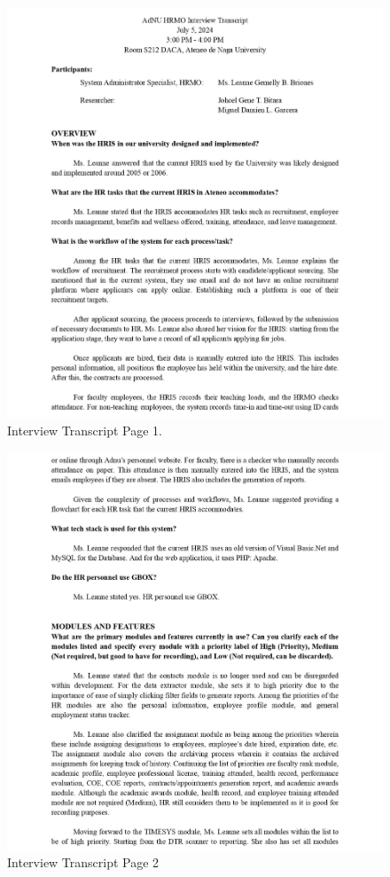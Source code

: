\begin{figure}[H]
    \centering
    \includegraphics[width=1\linewidth]{figures/misc/minutes/interview-transcript-0001.jpg}
    \caption{Interview Transcript Page 1.}
    \label{fig:interview-transcript-0001}
\end{figure}

\begin{figure}[H]
    \centering
    \includegraphics[width=1\linewidth]{figures/misc/minutes/interview-transcript-0002.jpg}
    \caption{Interview Transcript Page 2}
    \label{fig:interview-transcript-0002}
\end{figure}

